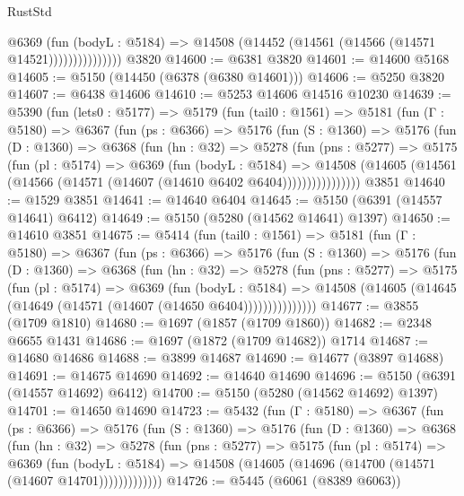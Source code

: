 \begin{lexlean}{RustStd}
\begin{coremodule}
                      @6369
                        (fun (bodyL : @5184) =>
                        @14508 (@14452 (@14561 (@14566 (@14571 @14521)))))))))))))))
    @3820
@14600 := @6381 @3820
@14601 := @14600 @5168
@14605 := @5150 (@14450 (@6378 (@6380 @14601)))
@14606 := @5250 @3820
@14607 := @6438 @14606
@14610 := @5253 @14606 @14516 @10230
@14639 := @5390
    (fun (lets0 : @5177) =>
    @5179
      (fun (tail0 : @1561) =>
      @5181
        (fun (Γ : @5180) =>
        @6367
          (fun (ps : @6366) =>
          @5176
            (fun (S : @1360) =>
            @5176
              (fun (D : @1360) =>
              @6368
                (fun (hn : @32) =>
                @5278
                  (fun (pns : @5277) =>
                  @5175
                    (fun (pl : @5174) =>
                    @6369
                      (fun (bodyL : @5184) =>
                      @14508
                        (@14605 (@14561 (@14566 (@14571 (@14607 (@14610 @6402 @6404))))))))))))))))
    @3851
@14640 := @1529 @3851
@14641 := @14640 @6404
@14645 := @5150 (@6391 (@14557 @14641) @6412)
@14649 := @5150 (@5280 (@14562 @14641) @1397)
@14650 := @14610 @3851
@14675 := @5414
    (fun (tail0 : @1561) =>
    @5181
      (fun (Γ : @5180) =>
      @6367
        (fun (ps : @6366) =>
        @5176
          (fun (S : @1360) =>
          @5176
            (fun (D : @1360) =>
            @6368
              (fun (hn : @32) =>
              @5278
                (fun (pns : @5277) =>
                @5175
                  (fun (pl : @5174) =>
                  @6369
                    (fun (bodyL : @5184) =>
                    @14508 (@14605 (@14645 (@14649 (@14571 (@14607 (@14650 @6404)))))))))))))))
@14677 := @3855 (@1709 @1810)
@14680 := @1697 (@1857 (@1709 @1860))
@14682 := @2348 @6655 @1431
@14686 := @1697 (@1872 (@1709 @14682)) @1714
@14687 := @14680 @14686
@14688 := @3899 @14687
@14690 := @14677 (@3897 @14688)
@14691 := @14675 @14690
@14692 := @14640 @14690
@14696 := @5150 (@6391 (@14557 @14692) @6412)
@14700 := @5150 (@5280 (@14562 @14692) @1397)
@14701 := @14650 @14690
@14723 := @5432
    (fun (Γ : @5180) =>
    @6367
      (fun (ps : @6366) =>
      @5176
        (fun (S : @1360) =>
        @5176
          (fun (D : @1360) =>
          @6368
            (fun (hn : @32) =>
            @5278
              (fun (pns : @5277) =>
              @5175
                (fun (pl : @5174) =>
                @6369
                  (fun (bodyL : @5184) =>
                  @14508 (@14605 (@14696 (@14700 (@14571 (@14607 @14701)))))))))))))
@14726 := @5445 (@6061 (@8389 @6063))

\end{coremodule}
\end{lexlean}

